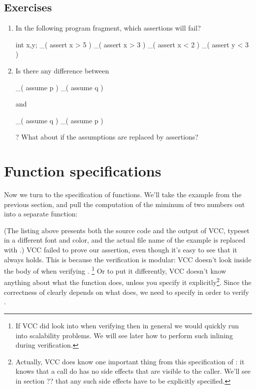 \subsection{Exercises}
\begin{enumerate}
\item
In the following program fragment, which assertions will fail?
\begin{VCC}
int x,y; 
_( assert x > 5 ) 
_( assert x > 3 ) 
_( assert x < 2 ) 
_( assert y < 3 )
\end{VCC}
\item
Is there any difference between 
\begin{VCC}
_( assume p ) _( assume q  )
\end{VCC}
and 
\begin{VCC}
_( assume q ) _( assume p )
\end{VCC}
? What about if the assumptions are replaced by assertions?
\end{enumerate}
\section{Function specifications}

Now we turn to the specification of functions. We'll take the example
from the previous section, and pull the computation of the miminum of
two numbers out into a separate function:


(The listing above presents both the source code and the output
of VCC, typeset in a different font and color, and 
the actual file name of the example is replaced with .)
VCC failed to prove our assertion, even though it's easy to see that
it always holds. This is because the verification is modular: VCC
doesn't look inside the body of  when verifying .%
\footnote{
  If VCC did look into  when verifying 
  then in general we would quickly run into scalability problems.
  We will see later how to perform such inlining during verification.
}
Or to put it differently, VCC doesn't know anything about what the
 function does, unless you specify it explicitly\footnote{
  Actually, VCC does know one important thing from this specification
  of : it knows that a call do  has no side
  effects that are visible to the caller. We'll see in section ?? that
  any such side effects have to be explicitly specified.
}.
Since the correctness of  clearly depends on what 
does, we need to specify  in order to verify .

